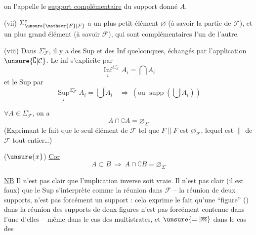 
on l'appelle le \uline{support complémentaire} du support donné $A$.

(vii) $\Sigma_{\unsure{\mathscr{F}|\mathcal{F}}}^\circ$ a un plus petit élément $\varnothing$ (à savoir la partie  de $\mathscr{F}$), et un plus grand élément (à savoir $\mathscr{F}$), qui sont complémentaires l'un de l'autre.


(viii)  Dans $\Sigma_{\mathscr{F}}^\circ$, il y a des Sup et des Inf quelconques, échangés par l'application $\unsure{\complement|\mathcal{C}}$. Le  inf s'explicite par
\[
\underset{i}{\operatorname{Inf}}^{\Sigma_{\mathscr{F}}^\circ}A_i=\bigcap A_i
\]
et le Sup par
\[
\underset{i}{\operatorname{Sup}}^{\Sigma_{\mathscr{F}}^\circ}A_i=\overline{\bigcup A_i}\quad\Rightarrow\ (\text{ou }\operatorname{supp}(\bigcup A_i))
\]

 $\forall A\in\Sigma_{\mathscr{F}}^\circ$, on a
\[
A\cap\complement A=\varnothing_\Sigma
\]
(Exprimant le fait que le seul élément de $\mathscr{F}$  tel que $F\parallel F$ est $\varnothing_{\mathscr{F}}$, lequel est $\parallel$ de $\mathscr{F}$ tout entier\ldots)

($\unsure{x}$) \uline{Cor}
\[
A\subset B\ \Longrightarrow\ A\cap\complement B=\varnothing_\Sigma
\]

\uline{NB} Il n'est pas clair que l'implication inverse soit vraie.  Il n'est pas clair  (il est  faux) que le Sup  s'interprète comme la réunion dans $\mathscr{F}$ -- la réunion de deux supports, n'est pas forcément un support : cela exprime le fait qu'une ``figure'' () dans la réunion des supports de deux figures n'est pas forcément contenue dans l'une d'elles -- même dans le cas des multistrates, et $\unsure{=|\overline m}$ dans le cas des
